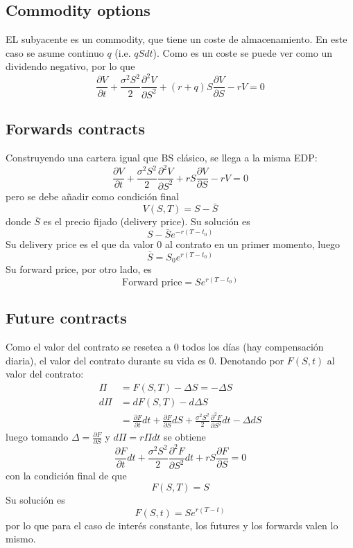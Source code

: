 \subsection{Commodity options}
EL subyacente es un commodity, que tiene un coste de almacenamiento. En este caso se asume continuo $q$ (i.e. $qSdt$). Como es un coste se puede ver como un dividendo negativo, por lo que
$$\boxed{\frac{\partial V}{\partial t} + \frac{\sigma^2S^2}{2} \frac{\partial^2 V}{\partial S^2} + (r+q)S \frac{\partial V}{\partial S} -rV = 0}$$




\subsection{Forwards contracts}
Construyendo una cartera igual que BS clásico, se llega a la misma EDP:
$$\boxed{\frac{\partial V}{\partial t} + \frac{\sigma^2S^2}{2} \frac{\partial^2 V}{\partial S^2} + rS \frac{\partial V}{\partial S} -rV = 0} $$
pero se debe añadir como condición final
$$\boxed{V(S,T)=S-\bar{S}}$$
donde $\bar{S}$ es el precio fijado (delivery price). Su solución es
$$\boxed{S-\bar{S}e^{-r(T-t_0)}}$$
Su delivery price es el que da valor 0 al contrato en un primer momento, luego 
$$\bar{S} = S_0e^{r(T-t_0)}$$
Su forward price, por otro lado, es  
$$\text{Forward price} = Se^{r(T-t_0)}$$




\subsection{Future contracts}
Como el valor del contrato se resetea a 0 todos los días (hay compensación diaria), el valor del contrato durante su vida es 0. Denotando por $F(S,t)$ al valor del contrato:
\begin{align*}
    \Pi &= F(S,T) - \Delta S = - \Delta S \\
    d\Pi &= dF(S,T) - d\Delta S \\
    &= \frac{\partial F}{\partial t}dt + \frac{\partial F}{\partial S}dS + \frac{\sigma^2S^2}{2} \frac{\partial^2 F}{\partial S^2}dt - \Delta dS
\end{align*}
luego tomando $\Delta = \frac{\partial F}{\partial S}$ y $d\Pi=r\Pi dt$ se obtiene
$$\boxed{\frac{\partial F}{\partial t}dt + \frac{\sigma^2S^2}{2} \frac{\partial^2 F}{\partial S^2}dt + rS\frac{\partial F}{\partial S} = 0}$$
con la condición final de que
$$\boxed{F(S,T) = S}$$
Su solución es
$$\boxed{F(S,t) = Se^{r(T-t)}}$$
por lo que para el caso de interés constante, los futures y los forwards valen lo mismo.






